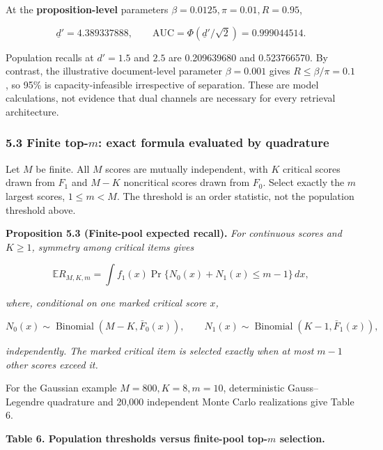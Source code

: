 \documentclass[
  11pt]{article}
\begin{document}
At the \textbf{proposition-level} parameters
\(\beta=0.0125,\pi=0.01,R=0.95\),

\[\underline d'=4.389337888,\qquad \mathrm{AUC}=\Phi(\underline d'/\sqrt2)=0.999044514.\]

Population recalls at \(d'=1.5\) and \(2.5\) are 0.209639680 and
0.523766570. By contrast, the illustrative document-level parameter
\(\beta=0.001\) gives \(R\le\beta/\pi=0.1\), so 95\% is
capacity-infeasible irrespective of separation. These are model
calculations, not evidence that dual channels are necessary for every
retrieval architecture.

\subsubsection{\texorpdfstring{5.3 Finite top-\(m\): exact formula
evaluated by
quadrature}{5.3 Finite top-m: exact formula evaluated by quadrature}}\label{finite-top-m-exact-formula-evaluated-by-quadrature}

Let \(M\) be finite. All \(M\) scores are mutually independent, with
\(K\) critical scores drawn from \(F_1\) and \(M-K\) noncritical scores
drawn from \(F_0\). Select exactly the \(m\) largest scores,
\(1\le m<M\). The threshold is an order statistic, not the population
threshold above.

\textbf{Proposition 5.3 (Finite-pool expected recall).} \emph{For
continuous scores and \(K\ge1\), symmetry among critical items gives}

\[\mathbb E R_{M,K,m}=\int f_1(x)\Pr\{N_0(x)+N_1(x)\le m-1\}\,dx,\]

\emph{where, conditional on one marked critical score \(x\),}

\[N_0(x)\sim\operatorname{Binomial}(M-K,\bar F_0(x)),\qquad N_1(x)\sim\operatorname{Binomial}(K-1,\bar F_1(x)),\]

\emph{independently. The marked critical item is selected exactly when
at most \(m-1\) other scores exceed it.}

For the Gaussian example \(M=800,K=8,m=10\), deterministic
Gauss--Legendre quadrature and 20,000 independent Monte Carlo
realizations give Table 6.

\textbf{Table 6. Population thresholds versus finite-pool top-\(m\)
selection.}
\end{document}

